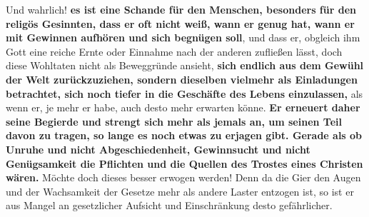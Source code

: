  Und wahrlich! \textbf{es ist eine
Schande für den Menschen, besonders für den
religös Gesinnten, dass er oft nicht weiß, wann er genug hat, wann er mit Gewinnen
aufhören und sich begnügen soll}, und dass er, obgleich ihm Gott eine reiche
Ernte
oder Einnahme nach der anderen zufließen lässt, doch diese Wohltaten nicht als
Beweggründe ansieht, \label{ref:13_07_reichtum_genuegsamkeit}
\textbf{sich endlich aus dem Gewühl der Welt zurückzuziehen,
sondern dieselben vielmehr als Einladungen betrachtet, sich noch tiefer in die
Geschäfte des Lebens einzulassen,} als wenn er, je mehr er habe, auch desto mehr
erwarten könne. \textbf{Er erneuert daher seine Begierde und strengt sich mehr
als
jemals an, um seinen Teil davon zu tragen, so lange es noch etwas zu erjagen
gibt. Gerade als ob Unruhe und nicht Abgeschiedenheit,
Gewinnsucht und nicht
Genügsamkeit die Pflichten und die Quellen des
Trostes eines Christen wären.}
Möchte doch dieses besser erwogen werden! Denn da die Gier den Augen und der
Wachsamkeit der Gesetze mehr als andere Laster entzogen ist, so ist er aus
 Mangel an gesetzlicher Aufsicht und
Einschränkung desto gefährlicher.

\medskip

